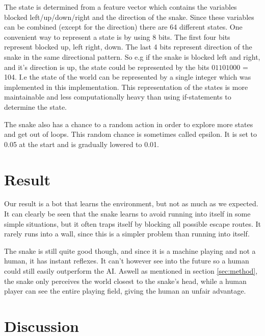 \documentclass[fleqn,10pt]{SelfArx} %
\begin{document}
The state is determined from a feature vector which contains the variables blocked left/up/down/right and the direction of the snake. Since these variables can be combined (except for the direction) there are 64 different states. One convenient way to represent a state is by using 8 bits. The first four bits represent blocked up, left right, down. The last 4 bits represent direction of the snake in the same directional pattern. So e.g if the snake is blocked left and right, and it's direction is up, the state could be represented by the bits $01101000$ = 104. I.e the state of the world can be represented by a single integer which was implemented in this implementation. This representation of the states is more maintainable and less computationally heavy than using if-statements to determine the state.

The snake also has a chance to a random action in order to explore more states and get out of loops. This random chance is sometimes called epsilon. It is set to 0.05 at the start and is gradually lowered to 0.01.


\section{Result} \label{sec:result}

Our result is a bot that learns the environment, but not as much as we expected. It can clearly be seen that the snake learns to avoid running into itself in some simple situations, but it often traps itself by blocking all possible escape routes. It rarely runs into a wall, since this is a simpler problem than running into itself.

The snake is still quite good though, and since it is a machine playing and not a human, it has instant reflexes. It can't however see into the future so a human could still easily outperform the AI. Aswell as mentioned in section \ref{sec:method}, the snake only perceives the world closest to the snake's head, while a human player can see the entire playing field, giving the human an unfair advantage.

\section{Discussion}
\end{document}

